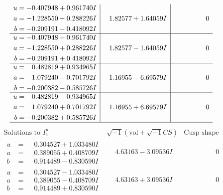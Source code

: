 \documentclass[1p]{elsarticle_modified}
\theoremstyle{definition}
\newcommand{\I}{\sqrt{-1}}
\begin{document}
$$\begin{array}{c|c|c}
\begin{aligned}
u &= -0.407948 + 0.961740 I \\
a &= -1.228550 - 0.288226 I \\
b &= -0.209191 - 0.418092 I\end{aligned}
 & \phantom{-}1.82577 + 1.64059 I & \phantom{-0.000000 } 0 \\ \hline\begin{aligned}
u &= -0.407948 - 0.961740 I \\
a &= -1.228550 + 0.288226 I \\
b &= -0.209191 + 0.418092 I\end{aligned}
 & \phantom{-}1.82577 - 1.64059 I & \phantom{-0.000000 } 0 \\ \hline\begin{aligned}
u &= \phantom{-}0.482819 + 0.934965 I \\
a &= \phantom{-}1.079240 - 0.701792 I \\
b &= -0.200382 - 0.585726 I\end{aligned}
 & \phantom{-}1.16955 - 6.69579 I & \phantom{-0.000000 } 0 \\ \hline\begin{aligned}
u &= \phantom{-}0.482819 - 0.934965 I \\
a &= \phantom{-}1.079240 + 0.701792 I \\
b &= -0.200382 + 0.585726 I\end{aligned}
 & \phantom{-}1.16955 + 6.69579 I & \phantom{-0.000000 } 0\\
 \hline 
 \end{array}$$\newpage$$\begin{array}{c|c|c}  
\text{Solutions to }I^u_{1}& \I (\text{vol} + \sqrt{-1}CS) & \text{Cusp shape}\\
 \hline 
\begin{aligned}
u &= \phantom{-}0.304527 + 1.033480 I \\
a &= \phantom{-}0.389055 + 0.408709 I \\
b &= \phantom{-}0.914489 - 0.830590 I\end{aligned}
 & \phantom{-}4.63163 - 3.09536 I & \phantom{-0.000000 } 0 \\ \hline\begin{aligned}
u &= \phantom{-}0.304527 - 1.033480 I \\
a &= \phantom{-}0.389055 - 0.408709 I \\
b &= \phantom{-}0.914489 + 0.830590 I\end{aligned}
 & \phantom{-}4.63163 + 3.09536 I & \phantom{-0.000000 } 0 \\ \hline\begin{aligned}

\end{aligned}
\end{array}$$
\end{document}
